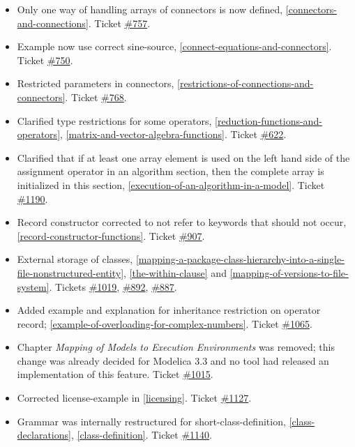 \begin{itemize}
\item
  Only one way of handling arrays of connectors is now defined,
  \cref{connectors-and-connections}. Ticket \href{https://github.com/modelica/ModelicaSpecification/issues/757}{\#757}.
\item
  Example now use correct sine-source, \cref{connect-equations-and-connectors}. Ticket
  \href{https://github.com/modelica/ModelicaSpecification/issues/750}{\#750}.
\item
  Restricted parameters in connectors, \cref{restrictions-of-connections-and-connectors}. Ticket
  \href{https://github.com/modelica/ModelicaSpecification/issues/768}{\#768}.
\item
  Clarified type restrictions for some operators, \cref{reduction-functions-and-operators},
  \cref{matrix-and-vector-algebra-functions}. Ticket
  \href{https://github.com/modelica/ModelicaSpecification/issues/622}{\#622}.
\item
  Clarified that if at least one array element is used on the left hand
  side of the assignment operator in an algorithm section, then the
  complete array is initialized in this section, \cref{execution-of-an-algorithm-in-a-model}. Ticket
  \href{https://github.com/modelica/ModelicaSpecification/issues/1190}{\#1190}.
\item
  Record constructor corrected to not refer to keywords that should not
  occur, \cref{record-constructor-functions}. Ticket
  \href{https://github.com/modelica/ModelicaSpecification/issues/907}{\#907}.
\item
  External storage of classes, \cref{mapping-a-package-class-hierarchy-into-a-single-file-nonstructured-entity},
  \cref{the-within-clause} and \cref{mapping-of-versions-to-file-system}.
  Tickets \href{https://github.com/modelica/ModelicaSpecification/issues/1019}{\#1019},
  \href{https://github.com/modelica/ModelicaSpecification/issues/892}{\#892},
  \href{https://github.com/modelica/ModelicaSpecification/issues/887}{\#887}.
\item
  Added example and explanation for inheritance restriction on operator
  record; \cref{example-of-overloading-for-complex-numbers}. Ticket
  \href{https://github.com/modelica/ModelicaSpecification/issues/1065}{\#1065}.
\item
  Chapter \emph{Mapping of Models to Execution Environments} was removed;
  this change was already decided for Modelica 3.3 and no tool had
  released an implementation of this feature. Ticket
  \href{https://github.com/modelica/ModelicaSpecification/issues/1015}{\#1015}.
\item
  Corrected license-example in \cref{licensing}. Ticket
  \href{https://github.com/modelica/ModelicaSpecification/issues/1127}{\#1127}.
\item
  Grammar was internally restructured for short-class-definition,
  \cref{class-declarations}, \cref{class-definition}. Ticket
  \href{https://github.com/modelica/ModelicaSpecification/issues/1140}{\#1140}.
\end{itemize}

